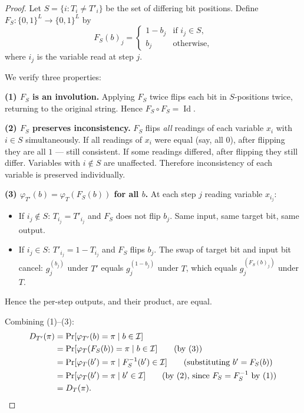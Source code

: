 \documentclass[11pt]{article}
\DeclareMathOperator{\Id}{Id}
\begin{document}
\begin{proof}
Let $S = \{i : T_i \neq T'_i\}$ be the set of differing bit positions.
Define $F_S : \{0,1\}^L \to \{0,1\}^L$ by
\[
F_S(b)_j =
\begin{cases}
1 - b_j & \text{if } i_j \in S, \\
b_j & \text{otherwise},
\end{cases}
\]
where $i_j$ is the variable read at step $j$.

We verify three properties:

\textbf{(1) $F_S$ is an involution.}
Applying $F_S$ twice flips each bit in $S$-positions twice, returning to
the original string. Hence $F_S \circ F_S = \Id$.

\textbf{(2) $F_S$ preserves inconsistency.}
$F_S$ flips \emph{all} readings of each variable $x_i$ with $i \in S$
simultaneously. If all readings of $x_i$ were equal (say, all $0$), after
flipping they are all $1$ --- still consistent. If some readings differed,
after flipping they still differ. Variables with $i \notin S$ are unaffected.
Therefore inconsistency of each variable is preserved individually.

\textbf{(3) $\varphi_{T'}(b) = \varphi_T(F_S(b))$ for all $b$.}
At each step $j$ reading variable $x_{i_j}$:
\begin{itemize}[nosep]
\item If $i_j \notin S$: $T_{i_j} = T'_{i_j}$ and $F_S$ does not flip $b_j$.
  Same input, same target bit, same output.
\item If $i_j \in S$: $T'_{i_j} = 1 - T_{i_j}$ and $F_S$ flips $b_j$.
  The swap of target bit and input bit cancel:
  $g_j^{(b_j)}$ under $T'$ equals $g_j^{(1-b_j)}$ under $T$, which equals
  $g_j^{(F_S(b)_j)}$ under $T$.
\end{itemize}
Hence the per-step outputs, and their product, are equal.

Combining (1)--(3):
\begin{align*}
D_{T'}(\pi) &= \Pr[\varphi_{T'}(b) = \pi \mid b \in \mathcal{I}] \\
&= \Pr[\varphi_T(F_S(b)) = \pi \mid b \in \mathcal{I}] \tag{by (3)} \\
&= \Pr[\varphi_T(b') = \pi \mid F_S^{-1}(b') \in \mathcal{I}]
\tag{substituting $b' = F_S(b)$} \\
&= \Pr[\varphi_T(b') = \pi \mid b' \in \mathcal{I}]
\tag{by (2), since $F_S = F_S^{-1}$ by (1)} \\
&= D_T(\pi). \qedhere
\end{align*}
\end{proof}
\end{document}
